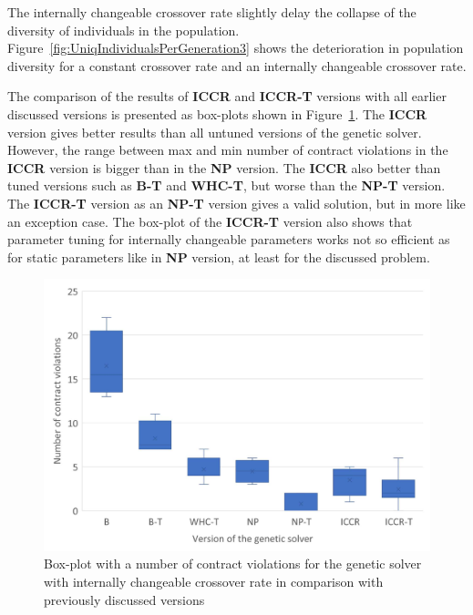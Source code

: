 The internally changeable crossover rate slightly delay the collapse of the diversity of individuals in the population. Figure~\ref{fig:UniqIndividualsPerGeneration3} shows the deterioration in population diversity for a constant crossover rate and an internally changeable crossover rate.


The comparison of the results of \textbf{ICCR} and \textbf{ICCR-T} versions with all earlier discussed versions is presented as box-plots shown in Figure~\ref{fig:boxplotsolverAdaptiveCrossoverTuning}. The \textbf{ICCR} version gives better results than all untuned versions of the genetic solver. However, the range between max and min number of contract violations in the \textbf{ICCR} version is bigger than in the \textbf{NP} version.
The \textbf{ICCR} also better than tuned versions such as \textbf{B-T} and \textbf{WHC-T}, but worse than the \textbf{NP-T} version. The \textbf{ICCR-T} version as an \textbf{NP-T} version gives a valid solution, but in more like an exception case. The box-plot of the \textbf{ICCR-T} version also shows that parameter tuning for internally changeable parameters works not so efficient as for static parameters like in \textbf{NP} version, at least for the discussed problem. 

\begin{figure}
	\centering
	\includegraphics[width=\textwidth]{images/BoxPlotSolverAdaptiveCrossoverTuning.pdf}
	\caption[Box-plot with a number of contract violations for the genetic solver with internally changeable crossover rate in comparison with previously discussed versions]{Box-plot with a number of contract violations for the genetic solver with internally changeable crossover rate in comparison with previously discussed versions}
	\label{fig:boxplotsolverAdaptiveCrossoverTuning}
\end{figure}


